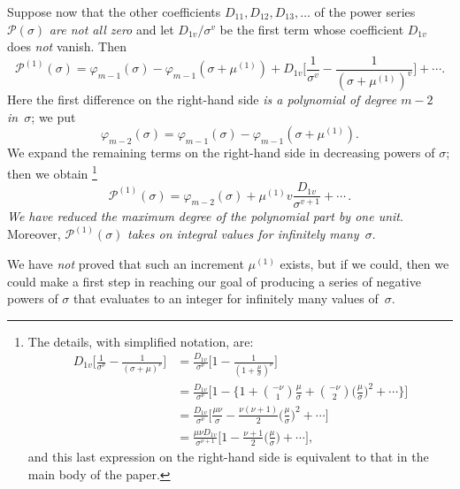 \documentclass{article}
\theoremstyle{plain}
\theoremstyle{definition}
\begin{document}
Suppose now that the other coefficients $D_{11},D_{12},D_{13},\dots$
of the power series $\mathcal{P}(\sigma)$ \emph{are not all zero} and
let $D_{1v}/\sigma^v$ be the first term whose coefficient $D_{1v}$
does \emph{not} vanish. Then
\[
\mathcal{P}^{(1)}(\sigma) = \varphi_{m-1}(\sigma) 
- \varphi_{m-1}(\sigma + \mu^{(1)}) 
+ D_{1v} \biggl[ \frac{1}{\sigma^v} 
- \frac{1}{(\sigma + \mu^{(1)})^v} \biggr] + \cdots .
\]
Here the first difference on the right-hand side \emph{is a polynomial
of degree $m - 2$ in~$\sigma$}; we put
\[
\varphi_{m-2}(\sigma) 
= \varphi_{m-1}(\sigma) - \varphi_{m-1}(\sigma + \mu^{(1)}).
\]
We expand the remaining terms on the right-hand side in decreasing 
powers of $\sigma$; then we obtain%
% 
\footnote{The details, with simplified notation, are:
\begin{align*}
D_{1v} \biggl[ \frac{1}{\sigma^\nu} 
- \frac{1}{(\sigma + \mu)^\nu} \biggr]
&= \frac{D_{1v}}{\sigma^\nu} \biggl[
1 - \frac{1}{(1 + \frac{\mu}{\sigma})^{\nu}} \biggr]
\\
&= \frac{D_{1v}}{\sigma^\nu} 
\biggl[ 1 - \biggl\{ 1 + \binom{-\nu}{1} \frac{\mu}{\sigma} 
+ \binom{-\nu}{2} \biggl( \frac{\mu}{\sigma} \biggr)^2 
+ \cdots \biggr\} \biggr]
\\
&= \frac{D_{1v}}{\sigma^\nu} 
 \biggl[ \frac{\mu\nu}{\sigma} - \frac{\nu(\nu + 1)}{2}
\biggl( \frac{\mu}{\sigma} \biggr)^2 + \cdots \biggr]
\\
&= \frac{\mu\nu D_{1v}}{\sigma^{\nu+1}} \biggl[
1 - \frac{\nu + 1}{2} \biggl( \frac{\mu}{\sigma} \biggr)
+ \cdots \biggr],
\end{align*}
and this last expression on the right-hand side is equivalent to that
in the main body of the paper.}
\[
\mathcal{P}^{(1)}(\sigma) 
= \varphi_{m-2}(\sigma) + \mu^{(1)}v\frac{D_{1v}}{\sigma^{v+1}} 
+\cdots \,.
\]
\emph{We have reduced the maximum degree of the polynomial part by one
unit}. Moreover, $\mathcal{P}^{(1)}(\sigma)$ \emph{takes on integral
values for infinitely many~$\sigma$}.

We have \emph{not} proved that such an increment $\mu^{(1)}$ exists,
but if we could, then we could make a first step in reaching our goal
of producing a series of negative powers of $\sigma$ that 
evaluates to
an integer for infinitely many values of~$\sigma$.
\end{document}
